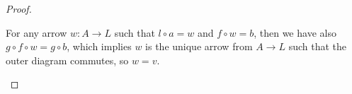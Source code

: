 \documentclass[./main.tex]{subfiles}
\begin{document}
\begin{proof}
\begin{enumerate}
          For any arrow $w : A \rightarrow L$ such that $l \circ a = w$
          and $f \circ w = b$, then we have also $g \circ f \circ w = g \circ b$,
          which implies $w$ is the unique arrow from $A \rightarrow L$ such that
          the outer diagram commutes, so $w = v$.
  \end{enumerate}
\end{proof}
\end{document}

